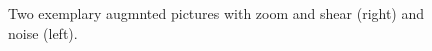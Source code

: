 \begin{figure}[H]
    \centering
    \begin{subfigure}{0.48\textwidth}
        \centering
    \end{subfigure}
    \hfill
    \begin{subfigure}{0.48\textwidth}
        \centering
    \end{subfigure}
    \caption{Two exemplary augmnted pictures with zoom and shear (right) and noise (left).}
    \label{fig:comp2}
\end{figure}
